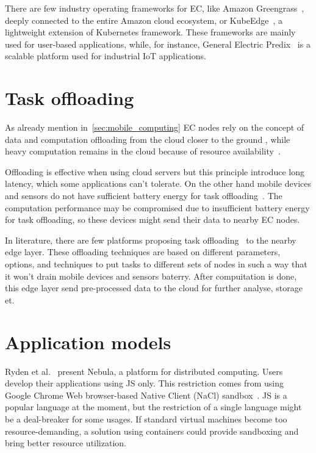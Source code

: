 There are few industry operating frameworks for EC, like Amazon Greengrass~\cite{kurniawan_2018}, deeply connected to the entire Amazon cloud ecosystem, or KubeEdge~\cite{KubeEdge}, a lightweight extension of Kubernetes framework. These frameworks are mainly used for user-based applications, while, for instance, General Electric Predix~\cite{GE_Predix} is a scalable platform used for industrial IoT applications.
%
%
\section{Task offloading}\label{sec:task_offloading}
%
As already mention in~\ref{sec:mobile_computing} EC nodes rely on the concept of data and computation offloading from the cloud closer to the ground \cite{KhuneP19}, while heavy computation remains in the cloud because of resource availability~\cite{NingLSY20}. 

Offloading is effective when using cloud servers but this principle introduce long latency, which some applications can't tolerate. On the other hand mobile devices and sensors do not have sufficient battery energy for task offloading~\cite{MaoZL16}. The computation performance may be compromised due to insufficient battery energy for task offloading, so these devices might send their data to nearby EC nodes.

In literature, there are few platforms proposing task offloading~\cite{ShiHPANZ14, KhuneP19, ChenHLLW15, LinLJL19, JiangCGZW19, MaoZL16} to the nearby edge layer. These offloading techniques are based on different parameters, options, and techniques to put tasks to different sets of nodes in such a way that it won't drain mobile devices and sensors baterry. After compuitation is done, this edge layer send pre-processed data to the cloud for further analyse, storage et. 
%
%
\section{Application models}\label{sec:applications}
%
Ryden et al.~\cite{RydenOCW14} present Nebula, a platform for distributed computing. Users develop their applications using JS only. This restriction comes from using Google Chrome Web browser-based Native Client (NaCl) sandbox~\cite{YeeSDCMOONF10}. JS is a popular language at the moment, but the restriction of a single language might be a deal-breaker for some usages. If standard virtual machines become too resource-demanding, a solution using containers could provide sandboxing and bring better resource utilization.

